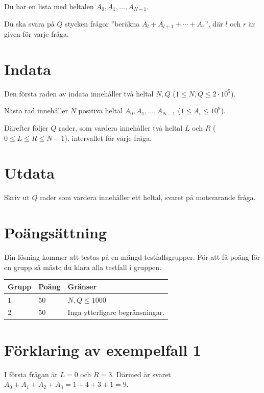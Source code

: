 Du har en lista med heltalen $A_0, A_1, \dots, A_{N-1}$.

Du ska svara på $Q$ stycken frågor ''beräkna $A_l+A_{l+1}+\cdots+A_{r}$'', där $l$ och $r$ är given
för varje fråga. 

\section*{Indata}
Den första raden av indata innehåller två heltal $N, Q$ ($1 \leq N, Q \leq 2 \cdot 10^5$).

Nästa rad innehåller $N$ positiva heltal $A_0, A_1, \dots, A_{N-1}$ ($1 \leq A_i \leq 10^9$).

Därefter följer $Q$ rader, som vardera innehåller två heltal $L$ och $R$ ($0 \leq L \leq R \leq N-1$),
intervallet för varje fråga.

\section*{Utdata}
Skriv ut $Q$ rader som vardera innehåller ett heltal, svaret på motsvarande fråga.

\section*{Poängsättning}
Din lösning kommer att testas på en mängd testfallsgrupper.
För att få poäng för en grupp så måste du klara alla testfall i gruppen.

\noindent
\begin{tabular}{| l | l | p{12cm} |}
  \hline
  \textbf{Grupp} & \textbf{Poäng} & \textbf{Gränser} \\ \hline
  $1$    & $50$      & $N, Q \leq 1000$ \\ \hline
  $2$    & $50$      & Inga ytterligare begränsningar. \\ \hline
\end{tabular}

\section*{Förklaring av exempelfall 1}
I första frågan är $L=0$ och $R=3$. Därmed är svaret $A_0+A_1+A_2+A_3=1+4+3+1=9$.
